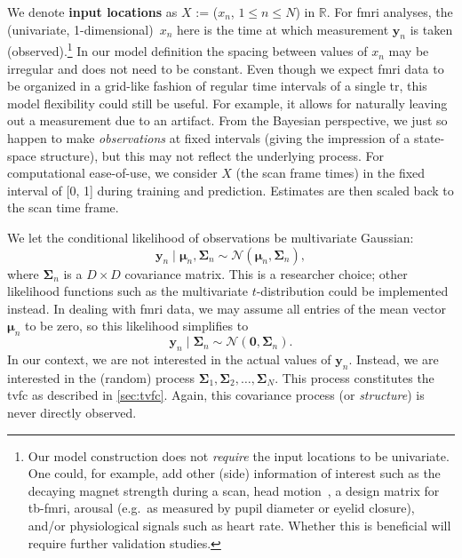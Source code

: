 We denote \textbf{input locations} as $X$ := ($x_n$, $1 \leq n \leq N$) in $\mathbb{R}$.
For \gls{fmri} analyses, the (univariate, 1-dimensional)~$x_n$ here is the time at which measurement $\mathbf{y}_n$ is taken (observed).\footnote{Our model construction does not \emph{require} the input locations to be univariate. One could, for example, add other (side) information of interest such as the decaying magnet strength during a scan, head motion~\parencite[often considered one of the most significant confounding factors, see e.g.][]{Laumann2017}, a design matrix for \gls{tb-fmri}, arousal (e.g.~as measured by pupil diameter or eyelid closure), and/or physiological signals such as heart rate. Whether this is beneficial will require further validation studies.}
In our model definition the spacing between values of $x_n$ may be irregular and does not need to be constant.
Even though we expect \gls{fmri} data to be organized in a grid-like fashion of regular time intervals of a single \gls{tr}, this model flexibility could still be useful.
For example, it allows for naturally leaving out a measurement due to an artifact.
From the Bayesian perspective, we just so happen to make \emph{observations} at fixed intervals (giving the impression of a state-space structure), but this may not reflect the underlying process.
For computational ease-of-use, we consider $X$ (the scan frame times) in the fixed interval of [0, 1] during training and prediction.
Estimates are then scaled back to the scan time frame.

We let the conditional likelihood of observations be multivariate Gaussian:
\begin{equation}
  \mathbf{y}_n \mid \boldsymbol{\mu}_n, \mathbf{\Sigma}_n \sim \mathcal{N}(\boldsymbol{\mu}_n, \mathbf{\Sigma}_n),
\end{equation}
where $\mathbf{\Sigma}_n$ is a $D \times D$ covariance matrix.
This is a researcher choice; other likelihood functions such as the multivariate $t$-distribution could be implemented instead.
In dealing with \gls{fmri} data, we may assume all entries of the mean vector~$\boldsymbol{\mu}_n$ to be zero, so this likelihood simplifies to
\begin{equation}
  \mathbf{y}_n \mid \mathbf{\Sigma}_n \sim \mathcal{N}(\textbf{0}, \mathbf{\Sigma}_n).
\end{equation}
In our context, we are not interested in the actual values of $\mathbf{y}_n$.
Instead, we are interested in the (random) process $\mathbf{\Sigma}_1, \mathbf{\Sigma}_2, \dots, \mathbf{\Sigma}_N$.
This process constitutes the \gls{tvfc} as described in \cref{sec:tvfc}.
Again, this covariance process (or \emph{structure}) is never directly observed.

